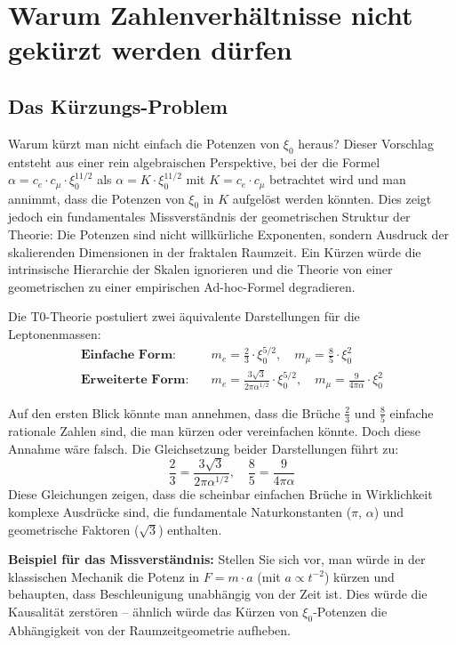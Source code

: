 \documentclass[12pt,a4paper]{article}
\newcommand{\xipar}{\xi_0}
\begin{document}
	
	\section{Warum Zahlenverhältnisse nicht gekürzt werden dürfen}
	
	\subsection{Das Kürzungs-Problem}
	Warum kürzt man nicht einfach die Potenzen von $\xipar$ heraus? Dieser Vorschlag entsteht aus einer rein algebraischen Perspektive, bei der die Formel $\alpha = c_e \cdot c_\mu \cdot \xipar^{11/2}$ als $\alpha = K \cdot \xipar^{11/2}$ mit $K = c_e \cdot c_\mu$ betrachtet wird und man annimmt, dass die Potenzen von $\xipar$ in $K$ aufgelöst werden könnten. Dies zeigt jedoch ein fundamentales Missverständnis der geometrischen Struktur der Theorie: Die Potenzen sind nicht willkürliche Exponenten, sondern Ausdruck der skalierenden Dimensionen in der fraktalen Raumzeit. Ein Kürzen würde die intrinsische Hierarchie der Skalen ignorieren und die Theorie von einer geometrischen zu einer empirischen Ad-hoc-Formel degradieren.
	
	Die T0-Theorie postuliert zwei äquivalente Darstellungen für die Leptonenmassen:
	\begin{align*}
		\textbf{Einfache Form:} &\quad m_e = \frac{2}{3} \cdot \xipar^{5/2}, \quad m_\mu = \frac{8}{5} \cdot \xipar^2 \\
		\textbf{Erweiterte Form:} &\quad m_e = \frac{3\sqrt{3}}{2\pi\alpha^{1/2}} \cdot \xipar^{5/2}, \quad m_\mu = \frac{9}{4\pi\alpha} \cdot \xipar^2
	\end{align*}
	
	Auf den ersten Blick könnte man annehmen, dass die Brüche $\frac{2}{3}$ und $\frac{8}{5}$ einfache rationale Zahlen sind, die man kürzen oder vereinfachen könnte. Doch diese Annahme wäre falsch. Die Gleichsetzung beider Darstellungen führt zu:
	\[
	\frac{2}{3} = \frac{3\sqrt{3}}{2\pi\alpha^{1/2}}, \quad \frac{8}{5} = \frac{9}{4\pi\alpha}
	\]
	Diese Gleichungen zeigen, dass die scheinbar einfachen Brüche in Wirklichkeit komplexe Ausdrücke sind, die fundamentale Naturkonstanten ($\pi$, $\alpha$) und geometrische Faktoren ($\sqrt{3}$) enthalten.
	
	\textbf{Beispiel für das Missverständnis:} Stellen Sie sich vor, man würde in der klassischen Mechanik die Potenz in $F = m \cdot a$ (mit $a \propto t^{-2}$) kürzen und behaupten, dass Beschleunigung unabhängig von der Zeit ist. Dies würde die Kausalität zerstören – ähnlich würde das Kürzen von $\xipar$-Potenzen die Abhängigkeit von der Raumzeitgeometrie aufheben.
	
\end{document}
